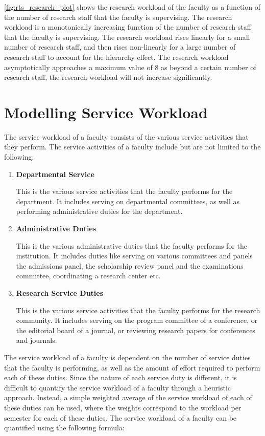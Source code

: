 \autoref{fig:rts_research_plot} shows the research workload of the faculty as a function of the number of research staff that the faculty is supervising. The research workload is a monotonically increasing function of the number of research staff that the faculty is supervising. The research workload rises linearly for a small number of research staff, and then rises non-linearly for a large number of research staff to account for the hierarchy effect. The research workload asymptotically approaches a maximum value of 8 as beyond a certain number of research staff, the research workload will not increase significantly.


\section{Modelling Service Workload}
\label{sec:modelling_service_workload}

The service workload of a faculty consists of the various service activities that they perform. The service activities of a faculty include but are not limited to the following:

\begin{enumerate}

  \item \textbf{Departmental Service}

        This is the various service activities that the faculty performs for the department. It includes serving on departmental committees, as well as performing administrative duties for the department.

  \item \textbf{Administrative Duties}

        This is the various administrative duties that the faculty performs for the institution. It includes duties like serving on various committees and panels the admissions panel, the scholarship review panel and the examinations committee, coordinating a research center etc.

  \item \textbf{Research Service Duties}

        This is the various service activities that the faculty performs for the research community. It includes serving on the program committee of a conference, or the editorial board of a journal, or reviewing research papers for conferences and journals.

\end{enumerate}

The service workload of a faculty is dependent on the number of service duties that the faculty is performing, as well as the amount of effort required to perform each of these duties. Since the nature of each service duty is different, it is difficult to quantify the service workload of a faculty through a heuristic approach. Instead, a simple weighted average of the service workload of each of these duties can be used, where the weights correspond to the workload per semester for each of these duties. The service workload of a faculty can be quantified using the following formula:


